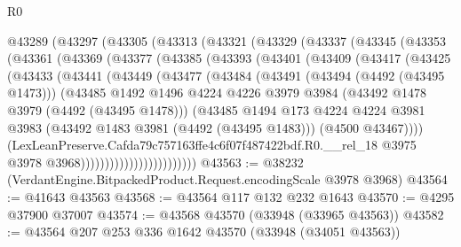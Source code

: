 \begin{lexlean}{R0}
\begin{coremodule}
    @43289
      (@43297
        (@43305
          (@43313
            (@43321
              (@43329
                (@43337
                  (@43345
                    (@43353
                      (@43361
                        (@43369
                          (@43377
                            (@43385
                              (@43393
                                (@43401
                                  (@43409
                                    (@43417
                                      (@43425
                                        (@43433
                                          (@43441
                                            (@43449
                                              (@43477
                                                (@43484
                                                  (@43491
                                                    (@43494 (@4492 (@43495 @1473)))
                                                    (@43485
                                                      @1492
                                                      @1496
                                                      @4224
                                                      @4226
                                                      @3979
                                                      @3984
                                                      (@43492 @1478 @3979 (@4492 (@43495 @1478)))
                                                      (@43485
                                                        @1494
                                                        @173
                                                        @4224
                                                        @4224
                                                        @3981
                                                        @3983
                                                        (@43492 @1483 @3981 (@4492 (@43495 @1483)))
                                                        (@4500 @43467))))
                                                  (LexLeanPreserve.Cafda79c757163ffe4c6f07f487422bdf.R0.__rel_18
                                                    @3975
                                                    @3978
                                                    @3968))))))))))))))))))))))))
@43563 := @38232 (VerdantEngine.BitpackedProduct.Request.encodingScale @3978 @3968)
@43564 := @41643 @43563
@43568 := @43564 @117 @132 @232 @1643
@43570 := @4295 @37900 @37007
@43574 := @43568 @43570 (@33948 (@33965 @43563))
@43582 := @43564 @207 @253 @336 @1642 @43570 (@33948 (@34051 @43563))

\end{coremodule}
\end{lexlean}

